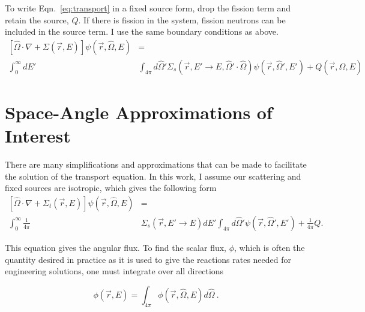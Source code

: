 To write Eqn.~\eqref{eq:transport} in a fixed source form, drop the fission term and retain the source, $Q$. If there is fission in the system, fission neutrons can be included in the source term. I use the same boundary conditions as above. 
%
\begin{equation}
\begin{split}
 [\hat{\Omega} \cdot \nabla + \Sigma(\vec{r}, E)]\psi(\vec{r}, \hat{\Omega}, E) &= \\ \int_0^\infty dE' &\int_{4\pi} d\hat{\Omega}' \Sigma_s(\vec{r}, E' \rightarrow E, \hat{\Omega}' \cdot \hat{\Omega})\psi(\vec{r}, \hat{\Omega}', E')  + Q(\vec{r}, \hat{\Omega}, E)
\end{split}
 \label{eq:transport_fixed_source}
\end{equation}



\section{Space-Angle Approximations of Interest}
There are many simplifications and approximations that can be made to facilitate the solution of the transport equation. In this work, I assume our scattering and fixed sources are isotropic, which gives the following form
%
\begin{equation}
\begin{split}
[\hat{\Omega} \cdot \nabla + \Sigma_t(\vec{r}, E)]\psi(\vec{r}, \hat{\Omega}, E) &= \\  \int_0^\infty \frac{1}{4\pi} &\Sigma_s(\vec{r}, E' \rightarrow E)  dE' \int_{4\pi} d\hat{\Omega}'\psi(\vec{r}, \hat{\Omega}', E')  + \frac{1}{4\pi}Q.
\end{split}
 \label{eq:transport_isotropic_scattering}
\end{equation}

This equation gives the angular flux. To find the scalar flux, $\phi$, which is often the quantity desired in practice as it is used to give the reactions rates needed for engineering solutions, one must integrate over all directions

\begin{equation}
  \phi(\vec{r}, E) = \int_{4\pi} \phi(\vec{r}, \hat{\Omega}, E) d \hat{\Omega}\:.
\end{equation}


